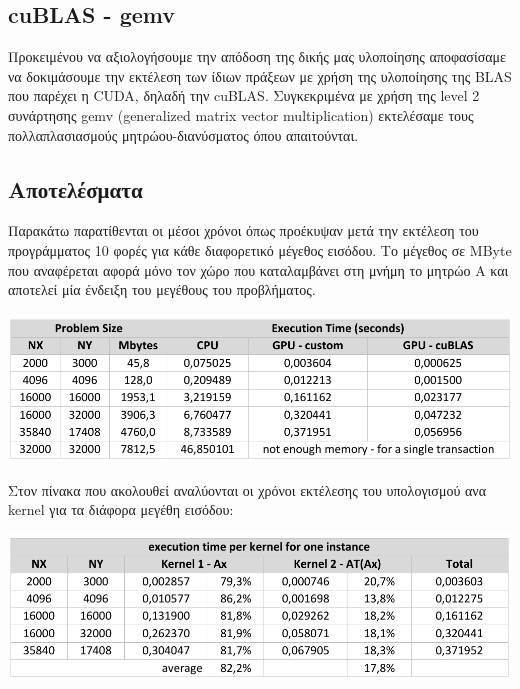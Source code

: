 \subsection*{cuBLAS - gemv}

\noindent Προκειμένου να αξιολογήσουμε την απόδοση της δικής μας υλοποίησης αποφασίσαμε να δοκιμάσουμε την εκτέλεση των ίδιων πράξεων με χρήση της υλοποίησης της BLAS που παρέχει η CUDA, δηλαδή την cuBLAS. Συγκεκριμένα με χρήση της level 2 συνάρτησης gemv (generalized matrix vector multiplication) εκτελέσαμε τους πολλαπλασιασμούς μητρώου-διανύσματος όπου απαιτούνται.


\subsection*{Αποτελέσματα}

\noindent Παρακάτω παρατίθενται οι μέσοι χρόνοι όπως προέκυψαν μετά την εκτέλεση του προγράμματος 10 φορές για κάθε διαφορετικό μέγεθος εισόδου. Το μέγεθος σε MByte που αναφέρεται αφορά μόνο τον χώρο που καταλαμβάνει στη μνήμη το μητρώο Α και αποτελεί μία ένδειξη του μεγέθους του προβλήματος.

\begin{center}
    \includegraphics[scale=0.9]{./figures/2_tnv/new1}
\end{center}

\newpage
\noindent Στον πίνακα που ακολουθεί αναλύονται οι χρόνοι εκτέλεσης του υπολογισμού ανα kernel για τα διάφορα μεγέθη εισόδου:

\begin{center}
    \includegraphics[scale=0.9]{./figures/2_tnv/new2}
\end{center}

